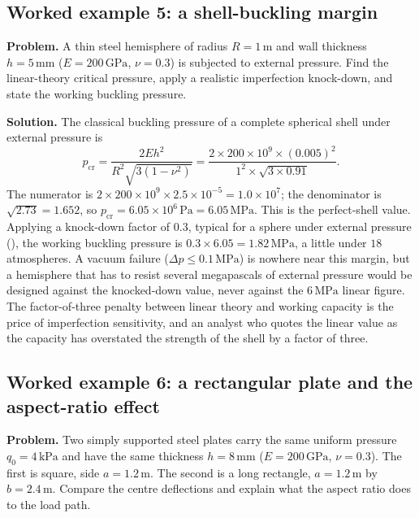 \subsection*{Worked example 5: a shell-buckling margin}

\textbf{Problem.} A thin steel hemisphere of radius $R = 1\,\si{\meter}$
and wall thickness $h = 5\,\si{\milli\meter}$ ($E = 200\,\text{GPa}$,
$\nu = 0.3$) is subjected to external pressure. Find the linear-theory
critical pressure, apply a realistic imperfection knock-down, and state
the working buckling pressure.

\textbf{Solution.} The classical buckling pressure of a complete
spherical shell under external pressure is
\[
p_{\text{cr}} = \frac{2E h^2}{R^2\sqrt{3(1-\nu^2)}}
= \frac{2\times 200\times 10^9 \times (0.005)^2}
{1^2 \times \sqrt{3\times 0.91}}.
\]
The numerator is $2\times 200\times 10^9 \times 2.5\times 10^{-5} =
1.0\times 10^7$; the denominator is $\sqrt{2.73} = 1.652$, so
$p_{\text{cr}} = 6.05\times 10^6\,\text{Pa} = 6.05\,\text{MPa}$. This is
the perfect-shell value. Applying a knock-down factor of $0.3$, typical
for a sphere under external pressure (),
the working buckling pressure is $0.3\times 6.05 = 1.82\,\text{MPa}$, a
little under $18$ atmospheres. A vacuum failure ($\Delta p \le 0.1\,
\text{MPa}$) is nowhere near this margin, but a hemisphere that has to
resist several megapascals of external pressure would be designed
against the knocked-down value, never against the $6\,\text{MPa}$
linear figure. The factor-of-three penalty between linear theory and
working capacity is the price of imperfection sensitivity, and an
analyst who quotes the linear value as the capacity has overstated the
strength of the shell by a factor of three.

\subsection*{Worked example 6: a rectangular plate and the aspect-ratio effect}

\textbf{Problem.} Two simply supported steel plates carry the same
uniform pressure $q_0 = 4\,\text{kPa}$ and have the same thickness
$h = 8\,\si{\milli\meter}$ ($E = 200\,\text{GPa}$, $\nu = 0.3$). The
first is square, side $a = 1.2\,\si{\meter}$. The second is a long
rectangle, $a = 1.2\,\si{\meter}$ by $b = 2.4\,\si{\meter}$. Compare
the centre deflections and explain what the aspect ratio does to the
load path.

